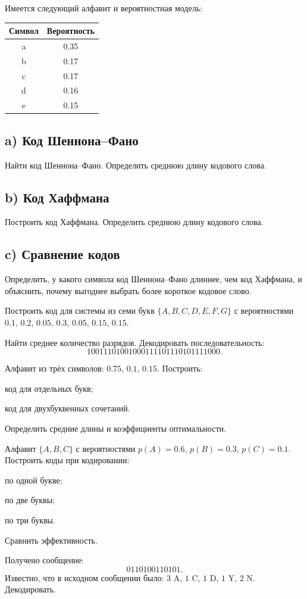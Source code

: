 \documentclass[a4paper,12pt,oneside]{article}
\begin{document}

Имеется следующий алфавит и вероятностная модель:

\begin{table}[H]
\centering
\begin{tabular}{cc}
\toprule
Символ & Вероятность \\
\midrule
a & 0.35 \\
b & 0.17 \\
c & 0.17 \\
d & 0.16 \\
e & 0.15 \\
\bottomrule
\end{tabular}
\end{table}

\subsection*{a) Код Шеннона--Фано}
Найти код Шеннона--Фано. Определить среднюю длину кодового слова.

\subsection*{b) Код Хаффмана}
Построить код Хаффмана. Определить среднюю длину кодового слова.

\subsection*{c) Сравнение кодов}
Определить, у какого символа код Шеннона--Фано длиннее, чем код Хаффмана, и объяснить, почему выгоднее выбрать более короткое кодовое слово.

Построить код для системы из семи букв $\{A,B,C,D,E,F,G\}$ с вероятностями
$0.1$, $0.2$, $0.05$, $0.3$, $0.05$, $0.15$, $0.15$.

Найти среднее количество разрядов. Декодировать последовательность:
\[
10011101001000111101110101111000.
\]

Алфавит из трёх символов: $0.75$, $0.1$, $0.15$. Построить:
\begin{alphlist}
    \item код для отдельных букв;
    \item код для двухбуквенных сочетаний.
\end{alphlist}
Определить средние длины и коэффициенты оптимальности.

Алфавит $\{A,B,C\}$ с вероятностями $p(A)=0.6$, $p(B)=0.3$, $p(C)=0.1$.
Построить коды при кодировании:
\begin{alphlist}
    \item по одной букве;
    \item по две буквы;
    \item по три буквы.
\end{alphlist}
Сравнить эффективность.

Получено сообщение:
\[
0110100110101.
\]
Известно, что в исходном сообщении было: $3$ A, $1$ C, $1$ D, $1$ Y, $2$ N. Декодировать.
\end{document}

